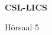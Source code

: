 \documentclass[a4paper]{article}
\begin{document}
\printGenericVSLHeader
\begin{center}
\begin{vsltext}{3cm}{4cm}

   \vspace{0.5cm} 

    \textbf{CSL-LICS} 

    \vspace{1.5cm}

    Hörsaal 5

\end{vsltext}

\end{center}
\end{document}
